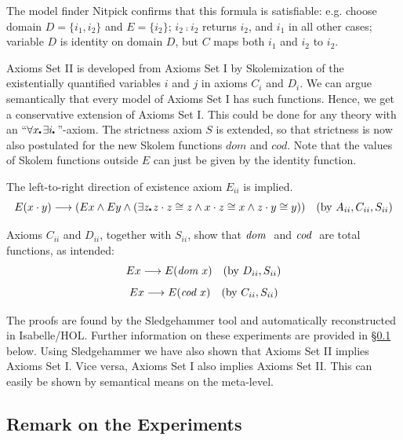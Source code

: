 The model finder Nitpick confirms that this formula is satisfiable:
e.g. choose domain $D=\{i_1,i_2\}$ and $E=\{i_2\}$; $i_2\comp i_2$ returns $i_2$,  and $i_1$
in all other cases; variable $D$ is identity on domain $D$, but $C$ maps both
$i_1$ and $i_2$ to $i_2$. 


Axioms Set II is developed from Axioms Set I by Skolemization of the
existentially quantified variables $i$ and $j$ in axioms $C_i$ and
$D_i$. We can argue semantically that every model of Axioms Set I has
such functions. Hence, we get a conservative extension of Axioms Set
I. This could be done for any theory with an ``$\forall x\lambdot \exists i\lambdot$''-axiom. The strictness axiom $S$ is extended, so
that strictness is now also postulated for the new Skolem functions
$dom$ and $cod$. Note that the values of Skolem functions
outside $E$ can just be given by the identity function.

The left-to-right direction of existence axiom $E_{ii}$ is implied. 
  $$E(x \comp y) \imp (E x \wedge E y \wedge (\exists z\lambdot z \comp z
  \cong z \wedge x \comp z \cong x \wedge z\comp y \cong y)) \quad
  (\text{by } A_{ii}, C_{ii}, S_{ii})$$

Axioms $C_{ii}$ and $D_{ii}$, together with $S_{ii}$, show that
${\textit{dom \/}}$ and ${\textit{cod \/}}$ are total functions, as intended: 
$$E x \longrightarrow E(\textit{dom \/} x) \quad (\text{by } D_{ii}, S_{ii})$$
$$E x \longrightarrow E(\textit{cod \/} x) \quad (\text{by } C_{ii}, S_{ii}) $$

The proofs are found by the Sledgehammer tool and automatically
reconstructed in Isabelle/HOL. Further information on these
experiments are provided in \S\ref{sec-remarks-experiments}
below. Using Sledgehammer we have also shown that Axioms Set II
implies Axioms Set I. Vice versa, Axioms Set I also implies Axioms Set
II. This can easily be shown by semantical means on the meta-level.

\subsection{Remark on the Experiments}  \label{sec-remarks-experiments}

